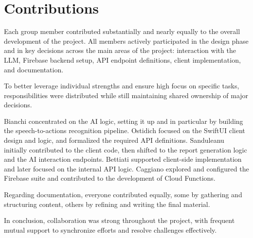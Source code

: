 \documentclass{article}
\begin{document}
\section{Contributions}

Each group member contributed substantially and nearly equally to the overall development of the project.
All members actively participated in the design phase and in key decisions across the main areas of the project: interaction with the LLM, Firebase backend setup, API endpoint definitions, client implementation, and documentation.

To better leverage individual strengths and ensure high focus on specific tasks, responsibilities were distributed while still maintaining shared ownership of major decisions.

Bianchi concentrated on the AI logic, setting it up and in particular by building the speech-to-actions recognition pipeline.
Ostidich focused on the SwiftUI client design and logic, and formalized the required API definitions.
Sanduleanu initially contributed to the client code, then shifted to the report generation logic and the AI interaction endpoints.
Bettiati supported client-side implementation and later focused on the internal API logic.
Caggiano explored and configured the Firebase suite and contributed to the development of Cloud Functions.

Regarding documentation, everyone contributed equally, some by gathering and structuring content, others by refining and writing the final material.

In conclusion, collaboration was strong throughout the project, with frequent mutual support to synchronize efforts and resolve challenges effectively.
\end{document}
